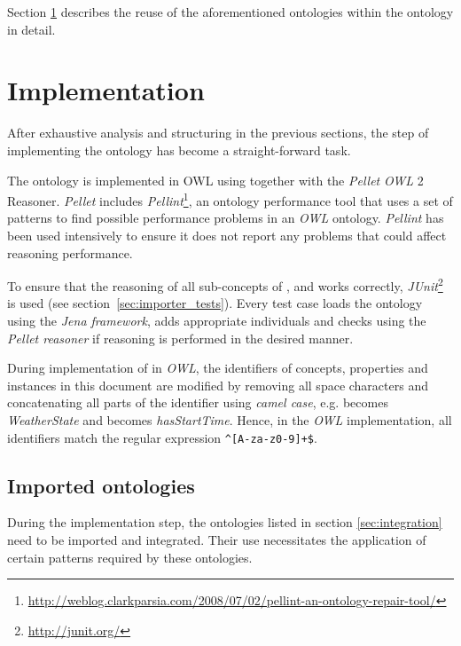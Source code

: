 Section \ref{sec:implementation} describes the reuse of the aforementioned ontologies within the \thinkhomeweather ontology in detail.

\section{Implementation}
\label{sec:implementation}

After exhaustive analysis and structuring in the previous sections, the step of implementing the ontology has become a straight-forward task.

The \thinkhomeweather ontology is implemented in OWL using  together with the \emph{Pellet} \emph{OWL} 2 Reasoner. \emph{Pellet} includes \emph{Pellint}\footnote{\href{http://weblog.clarkparsia.com/2008/07/02/pellint-an-ontology-repair-tool/}{http://weblog.clarkparsia.com/2008/07/02/pellint-an-ontology-repair-tool/}}, an ontology performance tool that uses a set of patterns to find possible performance problems in an \emph{OWL} ontology. \emph{Pellint} has been used intensively to ensure it does not report any problems that could affect reasoning performance.

To ensure that the reasoning of all sub-concepts of ,  and  works correctly, \emph{JUnit}\footnote{\href{http://junit.org/}{http://junit.org/}} is used (see section~\ref{sec:importer_tests}). Every test case loads the \thinkhomeweather ontology using the \emph{Jena framework}, adds appropriate individuals and checks using the \emph{Pellet reasoner} if reasoning is performed in the desired manner.

During implementation of \thinkhomeweather in \emph{OWL}, the identifiers of concepts, properties and instances in this document are modified by removing all space characters and concatenating all parts of the identifier using \emph{camel case}\cite{CamelCase}, e.g.  becomes \emph{WeatherState} and  becomes \emph{hasStartTime}. Hence, in the \emph{OWL} implementation, all identifiers match the regular expression \texttt{\textasciicircum[A-za-z0-9]+\$}.


\subsection{Imported ontologies}
\label{sec:ontology_imports}

During the implementation step, the ontologies listed in section \ref{sec:integration} need to be imported and integrated. Their use necessitates the application of certain patterns required by these ontologies.

